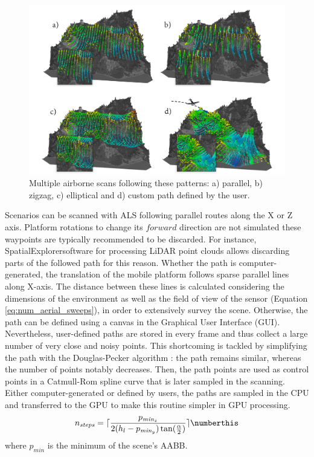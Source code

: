 \begin{figure}
    \centering
    \includegraphics[width=\linewidth]{figs/lidar_simulation/als_patterns.png}
	\caption{Multiple airborne scans following these patterns: a) parallel, b) zigzag, c) elliptical and d) custom path defined by the user. }
	\label{fig:als_patterns}
\end{figure}

Scenarios can be scanned with ALS following parallel routes along the X or Z axis. Platform rotations to change its $\textit{forward}$ direction are not simulated these waypoints are typically recommended to be discarded. For instance, SpatialExplorer\textregistered software for processing LiDAR point clouds allows discarding parts of the followed path for this reason. Whether the path is computer-generated, the translation of the mobile platform follows sparse parallel lines along X-axis. The distance between these lines is calculated considering the dimensions of the environment as well as the field of view of the sensor (Equation \ref{eq:num_aerial_sweeps}), in order to extensively survey the scene. Otherwise, the path can be defined using a canvas in the Graphical User Interface (GUI). Nevertheless, user-defined paths are stored in every frame and thus collect a large number of very close and noisy points. This shortcoming is tackled by simplifying the path with the Douglas-Pecker algorithm \cite{douglas_algorithms_1973}: the path remains similar, whereas the number of points notably decreases. Then, the path points are used as control points in a Catmull-Rom spline curve that is later sampled in the scanning. Either computer-generated or defined by users, the paths are sampled in the CPU and transferred to the GPU to make this routine simpler in GPU processing. 
\begin{equation}
    n_{\textit{steps}} = \lceil{\frac{p_{\textit{min}_z}}{2(h_{l} - p_{\textit{min}_y})\tan(\frac{\alpha}{2})}\rceil}
    \numberthis \label{eq:num_aerial_sweeps}
\end{equation}
where $p_{\textit{min}}$ is the minimum of the scene's AABB.

